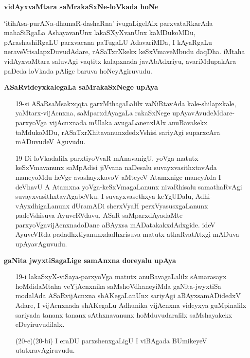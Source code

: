 \noindent
\textbf{vidAyxvaMtara saMrakaSxNe-loVkada hoNe}

`itihAsa-purANa-dhamaR-dashaRna' ivugaLigelAlx parxvataRkarAda mahaSiRgaLa AshayavanUnx lakaSXyXvanUnx kaMDukoMDu, pArashashiRgaLU parxvacana paTugaLU AdavariMDa, I kAyaRgaLu neraveVrisalapxDuvudAdare, rASaTxrXkekx keSxVmaveMbudu daqDha. iMtaha vidAyxvaMtara saluvAgi vaqtitx kalapxnada javAbAdxriyu, avariMdupakAra paDeda loVkada pAlige baruva hoNeyAgiruvudu.

\noindent
\textbf{ASaRvideyxkalegaLa saMrakaSxNege upAya}\label{page50}

\begin{itemize}
\item[19-si] ASaRsaMsakxqqta garxMthagaLalilx vaNiRtavAda kale-shilapxkale, yaMtarx-vijAcnxna, saMparxdAyagaLa rakaSxNege upAyavAvudeMdare-parxyoVga vijAcnxnada mUlaka avugaLanenxlAlx anuBavakekx taMdukoMDu, rASaTxrXhitavanunxdedxVshisi sariyAgi suparxcAra mADuvudeV Aguvudu.
\end{itemize}

\begin{itemize}
\item[19-Di] loVkadalilx parxtiyoVvaR mAnavanigU, yoVga matutx keSxVmavanunx saMpAdisi jiVvana naDesalu suvayxvasithxtavAda maneyoMdu heVge avashayxkavoV aMteyeV Atamxnige maneyAda I deVhavU A Atamxna yoVga-keSxVmagaLanunx nivaRhisalu samathaRvAgi suvayxvasithxtavAgabeVku. I suvayxvasethxya keYgUDalu, Adhi-vAyxdhigaLanunx dUramADi sherxVyaH perxVyasusxgaLanunx padeVshisuva AyuveRVdavu, ASaR saMparxdAyadaMte parxyoVgavijAcnxnadoDane aBAyxsa mADatakakxdAdxgide. ideV AyuveVRda padadhxtiyanunxdadhxrisuva matutx athaRvatAtxgi mADuva upAyavAguvudu.
\end{itemize}

\noindent
\textbf{gaNita jwyxtiSagaLige samAnxna doreyalu upAya}\label{page51}

\begin{itemize}
\item[19-i] lakaSxyX-viSaya-parxyoVga matutx anuBavagaLalilx sAmarasayx hoMdidaMtaha veYjAcnxnika saMshoVdhaneyiMda gaNita-jwyxtiSa modalAda ASaRvijAcnxna shAKegaLanUnx sariyAgi aBAyxsamADidedxV Adare, I vijAcnxnada shAKegaLu Adhunika vijAcnxna videyxya guMpinalilx sariyada tananx tananx sAthxnavanunx hoMduvudaralilx saMshayakekx eDeyiruvudilalx.
\end{itemize}

\begin{itemize}
\item[(20-e)(20-bi)] I eraDU parxshenxgaLigU I viBAgada BUmikeyeV utatxravAgiruvudu.
\end{itemize}

